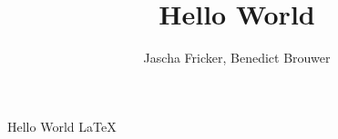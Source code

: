 \documentclass{article}
\title{Hello World}
\author{Jascha Fricker, Benedict Brouwer}
\begin{document}
    \maketitle
    Hello World \LaTeX
\end{document}
